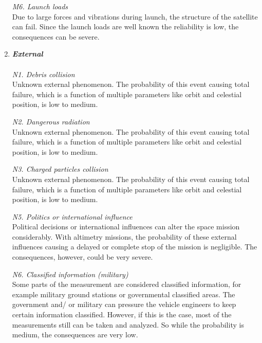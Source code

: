 \documentclass[11pt]{report}
\begin{document}
\begin{enumerate}[A]
\textit{M6. Launch loads} \\
Due to large forces and vibrations during launch, the structure of the satellite can fail. Since the launch loads are well known the reliability is low, the consequences can be severe.

	\item\textbf{\textit{External}} \\\\
\textit{N1. Debris collision}\\ 
Unknown external phenomenon. The probability of this event causing total failure, which is a function of multiple parameters like orbit and celestial position, is low to medium. 

\textit{N2. Dangerous radiation}\\ 
Unknown external phenomenon. The probability of this event causing total failure, which is a function of multiple parameters like orbit and celestial position, is low to medium. 

\textit{N3. Charged particles collision}\\ 
Unknown external phenomenon. The probability of this event causing total failure, which is a function of multiple parameters like orbit and celestial position, is low to medium. 

\textit{N5. Politics or international influence}\\ 
Political decisions or international influences can alter the space mission considerably.  With altimetry missions, the probability of these external influences causing a delayed or complete stop of the mission is negligible. The consequences, however, could be very severe. 

\textit{N6. Classified information (military)}\\ 
Some parts of the measurement are considered classified information, for example military ground stations or governmental classified areas. The government and/ or military can pressure the vehicle engineers to keep certain information classified. However, if this is the case, most of the measurements still can be taken and analyzed. So while the probability is medium, the consequences are very low.


\end{enumerate}
\end{document}
